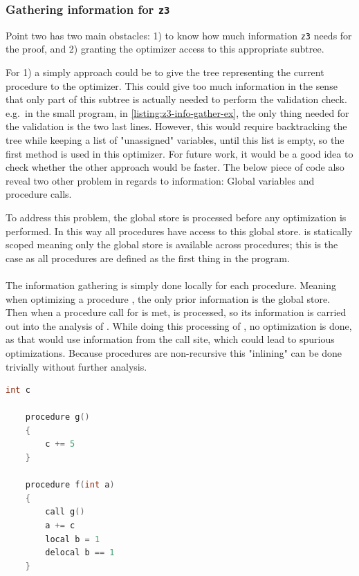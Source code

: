 \subsubsection{Gathering information for \texttt{z3} }
Point two has two main obstacles: 1) to know how much information \texttt{z3} needs for the proof,
and 2) granting the optimizer access to this appropriate subtree.

For 1) a simply approach could be to give the tree representing the current procedure to the
optimizer. This could give too much information in the sense that only part of this subtree is
actually needed to perform the validation check. e.g.\ in the small program, in
\autoref{listing:z3-info-gather-ex}, the only thing
needed for the validation is the two last lines. However, this would require backtracking the
tree while keeping a list of "unassigned" variables, until this list is empty, so the first
method is used in this optimizer. For future work, it would be a good idea to check whether the
other approach would be faster. The below piece of code also reveal two other problem in regards
to information: Global variables and procedure calls.

To address this problem, the global store is processed before any optimization is performed.
In this way all procedures have access to this global store. \lan is statically scoped meaning
only the global store is available across procedures; this is the case as all procedures are
defined as the first thing in the program.
\\
\\
The information gathering is simply done locally for each procedure. Meaning when optimizing
a procedure , the only prior information is the global store. Then when a procedure
call for  is met,  is processed, so its information is carried out into
the analysis of . While doing this processing of , no optimization is done,
as that would use information from the call site, which could lead to spurious optimizations.
Because procedures are non-recursive this "inlining" can be done trivially without further
analysis.

\begin{lstlisting}[language=C++, label=listing:z3-info-gather-ex,
    caption=Example on gathering information for \texttt{z3} where only last two lines are needed.]
    int c

    procedure g()
    {
        c += 5
    }

    procedure f(int a)
    {
        call g()
        a += c
        local b = 1
        delocal b == 1
    }
\end{lstlisting}

